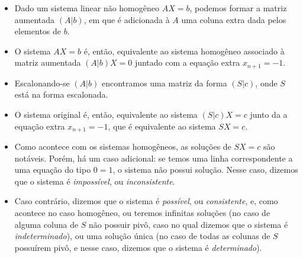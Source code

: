 \begin{itemize}
    \item Dado um sistema linear não homogêneo $AX=b$, podemos formar a matriz aumentada $(A|b)$, em que é adicionada à $A$ uma coluna extra dada pelos elementos de $b$.
    \item O sistema $AX=b$ é, então, equivalente ao sistema homogêneo associado à matriz aumentada $(A|b)X=0$ juntado com a equação extra $x_{n+1}=-1$.
    \item Escalonando-se $(A|b)$ encontramos uma matriz da forma $(S|c)$, onde $S$ está na forma escalonada.
    \item O sistema original é, então, equivalente ao sistema $(S|c)X=c$ junto da a equação extra $x_{n+1}=-1$, que é equivalente ao sistema $SX=c$.
    \item Como acontece com os sistemas homogêneos, as soluções de $SX=c$ são notáveis. Porém, há um caso adicional: se temos uma linha correspondente a uma equação do tipo $0=1$, o sistema não possui solução. Nesse caso, dizemos que o sistema é \emph{impossível}, ou \emph{inconsistente}.
    \item Caso contrário, dizemos que o sistema é \emph{possível}, ou \emph{consistente}, e, como acontece no caso homogêneo, ou teremos infinitas soluções (no caso de alguma coluna de $S$ não possuir pivô, caso no qual dizemos que o sistema é \emph{indeterminado}), ou uma solução única (no caso de todas as colunas de $S$ possuírem pivô, e nesse caso, dizemos que o sistema é \emph{determinado}).
\end{itemize}